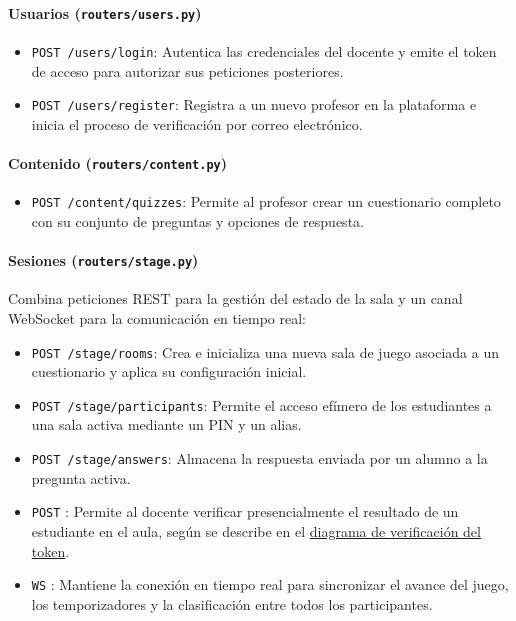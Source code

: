 \paragraph{Usuarios (\texttt{routers/users.py})}
\begin{itemize}
    \item \texttt{POST /users/login}: Autentica las credenciales del docente y emite el token de acceso para autorizar sus peticiones posteriores.
    \item \texttt{POST /users/register}: Registra a un nuevo profesor en la plataforma e inicia el proceso de verificación por correo electrónico.
\end{itemize}

\paragraph{Contenido (\texttt{routers/content.py})}
\begin{itemize}
    \item \texttt{POST /content/quizzes}: Permite al profesor crear un cuestionario completo con su conjunto de preguntas y opciones de respuesta.
\end{itemize}

\paragraph{Sesiones (\texttt{routers/stage.py})}
Combina peticiones REST para la gestión del estado de la sala y un canal WebSocket para la comunicación en tiempo real:

\begin{itemize}
    \item \texttt{POST /stage/rooms}: Crea e inicializa una nueva sala de juego asociada a un cuestionario y aplica su configuración inicial.
    \item \texttt{POST /stage/participants}: Permite el acceso efímero de los estudiantes a una sala activa mediante un PIN y un alias.
    \item \texttt{POST /stage/answers}: Almacena la respuesta enviada por un alumno a la pregunta activa.
    \item \texttt{POST} : Permite al docente verificar presencialmente el resultado de un estudiante en el aula, según se describe en el \hyperref[fig:diagrama_token_participante]{diagrama de verificación del token}.
    \item \texttt{WS} : Mantiene la conexión en tiempo real para sincronizar el avance del juego, los temporizadores y la clasificación entre todos los participantes.
\end{itemize}

